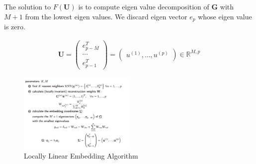 The solution to $F(\boldsymbol{U})$ is to compute eigen value decomposition of $\boldsymbol{G}$ with $M+1$ from the lowest eigen values. We discard eigen vector $e_p$ whose eigen value is zero. 

\begin{align*}
	\boldsymbol{U} = \begin{pmatrix}
 	e_{p-M}^T \\
 	\cdots \\
 	e_{p-1}^T
 	\end{pmatrix} 
 	= \begin{pmatrix}
 		u^{(1)}, \dots, u^{(p)}
 	\end{pmatrix} \in \mathbb{R}^{M,p}
\end{align*}

\begin{figure}[hbt]
	\center
  \includegraphics[width=0.5\textwidth]{figures/cl-lle-algo}
  \caption{Locally Linear Embedding Algorithm}
  \label{fig:cl-lle-algo}
\end{figure}

